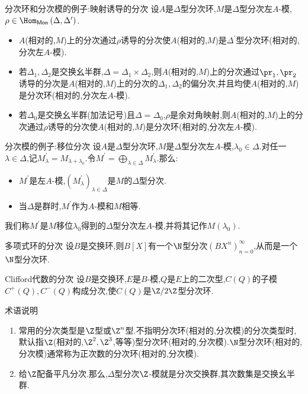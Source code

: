 \begin{example}{分次环和分次模的例子:映射诱导的分次}{}
	设$A$是$\Delta$型分次环,$M$是$\Delta$型分次左$A$-模,$\rho\in\Hom_{\mathsf{Mon}}\left(\Delta,\Delta^{\prime}\right)$.
	\begin{itemize}
		\item $A$(相对的,$M$)上的分次通过$\rho$诱导的分次使$A$(相对的,$M$)是$\Delta^{\prime}$型分次环(相对的,分次左$A$-模).
		\item 若$\Delta_{1},\Delta_{2}$是交换幺半群,$\Delta=\Delta_{1}\times\Delta_{2}$,则$A$(相对的,$M$)上的分次通过$\pr_{1},\pr_{2}$诱导的分次是$A$(相对的,$M$)上的分次的$\Delta_{1},\Delta_{2}$的偏分次,并且均使$A$(相对的,$M$)是分次环(相对的,分次左$A$-模).
		\item 若$\Delta_{0}$是交换幺半群(加法记号)且$\Delta=\Delta_{0}$,$\rho$是余对角映射,则$A$(相对的,$M$)上的分次通过$\rho$诱导的分次使$A$(相对的,$M$)是分次环(相对的,分次左$A$-模).
	\end{itemize}
\end{example}

\begin{example}{分次模的例子:移位分次}{}
	设$A$是$\Delta$型分次环,$M$是$\Delta$型分次左$A$-模,$\lambda_{0}\in\Delta$.对任一$\lambda\in\Delta$,记$M_{\lambda}^{\prime}=M_{\lambda+\lambda_{0}}$.令$M^{\prime}=\bigoplus\limits_{\lambda\in\Delta}M_{\lambda}^{\prime}$.那么:
	\begin{itemize}
		\item $M^{\prime}$是左$A$-模,$\left(M_{\lambda}^{\prime}\right)_{\lambda\in\Delta}$是$M$的$\Delta$型分次.
		\item 当$\Delta$是群时,$M^{\prime}$作为$A$-模和$M$相等.
	\end{itemize}
	我们称$M^{\prime}$是$M$移位$\lambda_{0}$得到的$\Delta$型分次左$A$-模,并将其记作$M\left(\lambda_{0}\right)$.
\end{example}

\begin{example}{多项式环的分次}{}
	设$B$是交换环,则$B\left[X\right]$有一个$\N$型分次$\left(BX^{n}\right)_{n=0}^{\infty}$,从而是一个$\N$型分次环.
\end{example}

\begin{example}{Clifford代数的分次}{}
	设$B$是交换环,$E$是$B$-模,$Q$是$E$上的二次型,$C\left(Q\right)$的子模$C^{+}\left(Q\right),C^{-}\left(Q\right)$构成分次,使$C\left(Q\right)$是$\Z/2\Z$型分次环.
\end{example}

\begin{remark}{术语说明}{}
	\begin{enumerate}
		\item 常用的分次类型是$\Z$型或$\Z^{n}$型.不指明分次环(相对的,分次模)的分次类型时,默认指$\Z$(相对的,$\Z^{2},\Z^{3}$,等等)型分次环(相对的,分次模).$\N$型分次环(相对的,分次模)通常称为正次数的分次环(相对的,分次模).
		\item 给$\Z$配备平凡分次.那么,$\Delta$型分次$\Z$-模就是分次交换群,其次数集是交换幺半群.
	\end{enumerate}
\end{remark}


